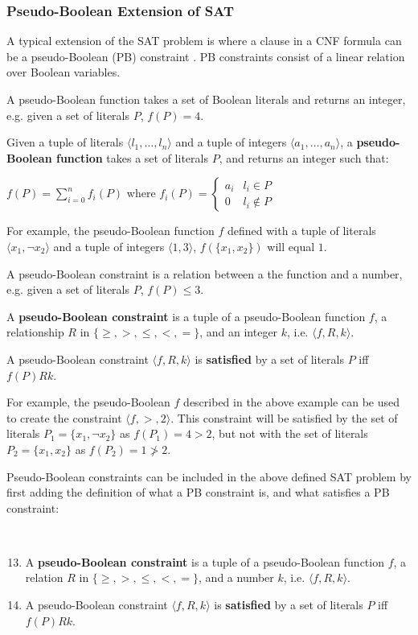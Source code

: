 \subsubsection{Pseudo-Boolean Extension of SAT}
A typical extension of the SAT problem is where a clause in a CNF formula can be a pseudo-Boolean (PB) constraint \citep{dixon2004automating}.
PB constraints consist of a linear relation over Boolean variables.

A pseudo-Boolean function takes a set of Boolean literals and returns an integer, e.g. given a set of literals $P$, $f(P) = 4$.
\begin{defs}
\label{impl.PBfunction}
Given a tuple of literals $\langle l_1,\ldots,l_n \rangle$ and a tuple of integers $\langle a_1,\ldots,a_n\rangle$,
a \textbf{pseudo-Boolean function} takes a set of literals $P$, and returns an integer such that:

$f(P) = \sum \limits_{i=0}^n f_i(P)$
where $f_i(P) = \begin{cases} a_i & l_i \in P \\ 0 & l_i \not \in P \end{cases}$
\end{defs}
For example, the pseudo-Boolean function $f$ defined with a tuple of literals $\langle x_1, \neg x_2\rangle$ and a tuple of integers $\langle 1,3\rangle$,
 $f(\{x_1, x_2\})$ will equal $1$.

A pseudo-Boolean constraint is a relation between a the function and a number, e.g. given a set of literals $P$, $f(P) \leq 3$.
\begin{defs}
\label{impl.PBConstraint}
A \textbf{pseudo-Boolean constraint} is a tuple of a pseudo-Boolean function $f$, a relationship  $R$ in $\{\geq,>,\leq,<,=\}$, and an integer $k$, i.e. $\langle f,R,k\rangle$.
\end{defs}

\begin{defs}
A pseudo-Boolean constraint $\langle f,R,k\rangle$ is \textbf{satisfied} by a set of literals $P$ iff $ f(P) R k$.
\end{defs}
For example, the pseudo-Boolean $f$ described in the above example can be used to create the constraint $\langle f, >, 2 \rangle$.  
This constraint will be satisfied by the set of literals $P_1 = \{ x_1, \neg x_2 \}$ as $f(P_1) = 4 > 2$, but not with the set of literals $P_2 = \{ x_1,  x_2 \}$ as $f(P_2) = 1 \not > 2$.

Pseudo-Boolean constraints can be included in the above defined SAT problem by first adding the definition of what a PB constraint is, and what satisfies a PB constraint:
\begin{defs}
{\ }
\begin{enumerate}
\setcounter{enumi}{12}
  \item A \textbf{pseudo-Boolean constraint} is a tuple of a pseudo-Boolean function $f$, a relation $R$ in $\{\geq,>,\leq,<,=\}$, and a number $k$, i.e. $\langle f,R,k\rangle$.
  \item A pseudo-Boolean constraint $\langle f,R,k\rangle$ is \textbf{satisfied} by a set of literals $P$ iff $ f(P) R k$.
\end{enumerate}
\end{defs}

